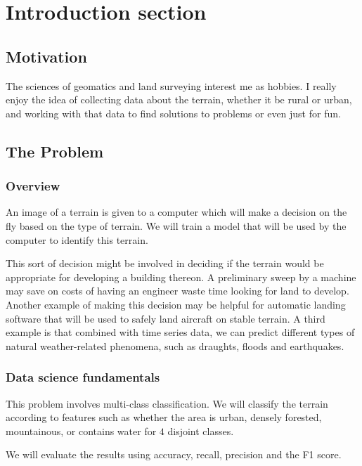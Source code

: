 \documentclass[11pt]{article}
\begin{document}
\section{Introduction section}

\subsection{Motivation}

The sciences of geomatics and land surveying interest me as hobbies.
I really enjoy the idea of collecting data about the terrain,
whether it be rural or urban,
and working with that data to find solutions to problems
or even just for fun.

\subsection{The Problem}

\subsubsection{Overview}

An image of a terrain is given to a computer which will make a decision on the fly based on the type of terrain.
We will train a model that will be used by the computer to identify this terrain.

This sort of decision might be involved in deciding if the terrain would be appropriate for developing a building thereon.
A preliminary sweep by a machine may save on costs of having an engineer waste time looking for land to develop.
Another example of making this decision may be helpful for automatic landing software that will be used to safely land aircraft on stable terrain.
A third example is that combined with time series data, we can predict different types of natural weather-related phenomena,
such as draughts, floods and earthquakes.

\subsubsection{Data science fundamentals}

This problem involves multi-class classification.
We will classify the terrain according to features such as whether the area is
urban, densely forested, mountainous, or contains water
for \(4\) disjoint classes.

We will evaluate the results using
accuracy, recall, precision and the F1 score.
\end{document}
